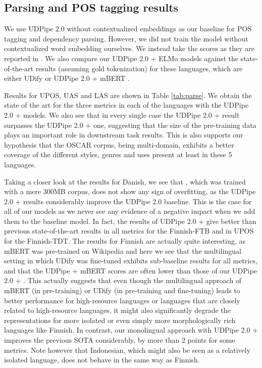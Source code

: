\subsection{Parsing and POS tagging results}
We use UDPipe 2.0 without contextualized embeddings as our baseline for POS tagging and dependency parsing. However, we did not train the model without contextualized word embedding ourselves. We instead take the scores as they are reported in \citep{kondratyuk-straka-2019-75}. We also compare our UDPipe 2.0 + ELMo models against the state-of-the-art results (assuming gold tokenization) for these languages, which are either UDify \citep{kondratyuk-straka-2019-75} or UDPipe 2.0 + mBERT \citep{straka-strakova-2019-evaluating}.

Results for UPOS, UAS and LAS are shown in Table \ref{tab:parse}. We obtain the state of the art for the three metrics in each of the languages with the UDPipe 2.0 + \elmooscar models. We also see that in every single case the UDPipe 2.0 + \elmooscar result surpasses the UDPipe 2.0 + \elmowiki one, suggesting that the size of the pre-training data plays an important role in downstream task results. This is also supports our hypothesis that the OSCAR corpus, being multi-domain, exhibits a better coverage of the different styles, genres and uses present at least in these 5 languages.

Taking a closer look at the results for Danish, we see that \elmowiki, which was trained with a mere 300MB corpus, does not show any sign of overfitting, as the UDPipe 2.0 + \elmowiki results considerably improve the UDPipe 2.0 baseline. This is the case for all of our \elmowiki models as we never see any evidence of a negative impact when we add them to the baseline model. In fact, the results of UDPipe 2.0 + \elmowiki give better than previous state-of-the-art results in all metrics for the Finnish-FTB and in UPOS for the Finnish-TDT. The results for Finnish are actually quite interesting, as mBERT was pre-trained on Wikipedia and here we see that the multilingual setting in which UDify was fine-tuned exhibits sub-baseline results for all metrics, and that the UDPipe + mBERT scores are often lower than those of our UDPipe 2.0 + \elmowiki. This actually suggests that even though the multilingual approach of mBERT (in pre-training) or UDify (in pre-training and fine-tuning) leads to better performance for  high-resource languages or languages that are closely related to high-resource languages, it might also significantly degrade the representations for more isolated or even simply more morphologically rich languages like Finnish. In contrast, our monolingual approach with UDPipe 2.0 + \elmooscar improves the previous SOTA considerably, by more than 2 points for some metrics. Note however that Indonesian, which might also be seen as a relatively isolated language, does not behave in the same way as Finnish.

